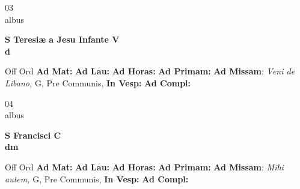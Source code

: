 \documentclass[10pt, openany]{book}
\begin{document}
    \begin{center}
        \begin{minipage}{3.5in}
            \vspace{2em}
            \begin{minipage}{0.5in}
                {\Huge 03} \\
                {\normalsize albus}
            \end{minipage}
            \begin{minipage}{3.0in}
                \textbf{ \large S Teresiæ a Jesu Infante V \\
                \textnormal{\normalsize d}}

            \end{minipage}
            \begin{justify}Off Ord
                \textbf{Ad Mat: }
                \textbf{Ad Lau: }
                \textbf{Ad Horas: }
                \textbf{Ad Primam: }\textbf{Ad Missam}: \textit{Veni de Libano,} G, Pre Communis, 
                \textbf{In Vesp: }
                \textbf{Ad Compl: }
            \end{justify}
        \end{minipage}
    \end{center}

    \begin{center}
        \begin{minipage}{3.5in}
            \vspace{2em}
            \begin{minipage}{0.5in}
                {\Huge 04} \\
                {\normalsize albus}
            \end{minipage}
            \begin{minipage}{3.0in}
                \textbf{ \large S Francisci C \\
                \textnormal{\normalsize dm}}

            \end{minipage}
            \begin{justify}Off Ord
                \textbf{Ad Mat: }
                \textbf{Ad Lau: }
                \textbf{Ad Horas: }
                \textbf{Ad Primam: }\textbf{Ad Missam}: \textit{Mihi autem,} G, Pre Communis, 
                \textbf{In Vesp: }
                \textbf{Ad Compl: }
            \end{justify}
        \end{minipage}
    \end{center}
\end{document}
